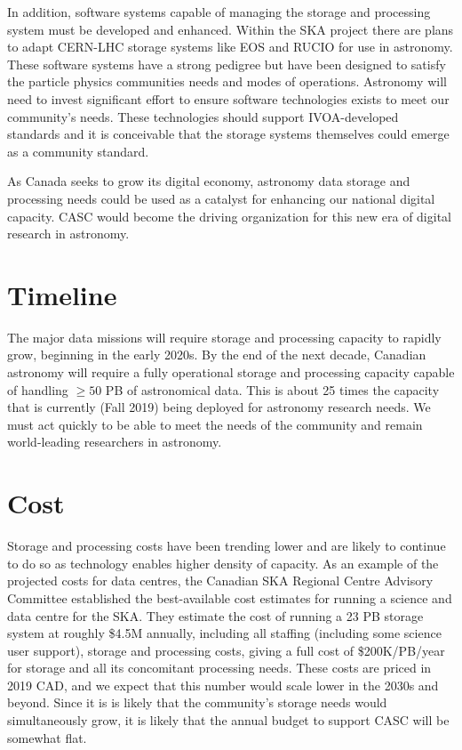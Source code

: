 \documentclass[11pt]{article}
\begin{document}
In addition, software systems capable of managing the storage and processing system must be developed and enhanced.  Within the SKA project there are plans to adapt CERN-LHC storage systems like EOS and RUCIO for use in astronomy.  These software systems have a strong pedigree but have been designed to satisfy the particle physics communities needs and modes of operations.  Astronomy will need to invest significant effort to ensure software technologies exists to meet our community's needs.  These technologies should support IVOA-developed standards and it is conceivable that the storage systems themselves could emerge as a community standard. 

As Canada seeks to grow its digital economy, astronomy data storage and processing needs could be used as a catalyst for enhancing our national digital capacity.  
CASC would become the driving organization for this new era of digital research in astronomy. 

\section{Timeline}
The major data missions will require storage and processing capacity to rapidly grow, beginning in the early 2020s.   By the end of the next decade, Canadian astronomy will require a fully operational storage and processing capacity capable of handling $\ge 50$ PB of astronomical data. This is about 25 times the capacity that is currently (Fall 2019) being deployed for astronomy research needs.  We must act quickly to be able to meet the needs of the community and remain world-leading researchers in astronomy.

\section{Cost}
Storage and processing costs have been trending lower and are likely to continue to do so as technology enables higher density of capacity.   As an example of the projected costs for data centres, the Canadian SKA Regional Centre Advisory Committee established the best-available cost estimates for running a science and data centre for the SKA. They estimate the cost of running a 23 PB storage system at roughly \$4.5M annually, including all staffing (including some science user support), storage and processing costs, giving a full cost of \$200K/PB/year for storage and all its concomitant processing needs. These costs are priced in 2019 CAD, and we expect that this number would scale lower in the 2030s and beyond.  Since it is is likely that the community's storage needs would simultaneously grow,  it is likely that the annual budget to support CASC will be somewhat flat.
\end{document}

